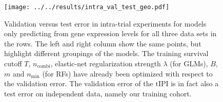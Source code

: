 \begin{figure}
    \centering
    \texttt{[image: ../../results/intra\_val\_test\_geo.pdf]}
    \caption{Validation versus test error in intra-trial experiments for models only predicting 
        from gene expression levels for all 
        three data sets in the rows. The left and right column show the same points, but highlight 
        different groupings of the models. The training survival cutoff $T$, 
        $n_\text{combi}$, elastic-net regularization strength $\lambda$ (for GLMs), 
        $B$, $m$ and $n_\text{min}$ (for RFs) have already been optimized with respect to the 
        validation error. The 
        validation error of the $\text{tIPI}$ is in fact also a test error on independent data, 
        namely our training cohort.}
    \label{fig:intra-val-test-geo}
\end{figure}